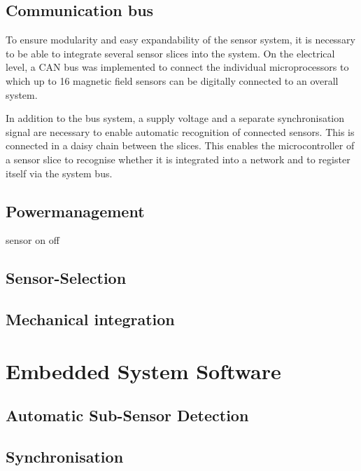 \documentclass[conference]{IEEEtran}
\begin{document}
\subsection{Communication bus}
To ensure modularity and easy expandability of the sensor system, it is necessary to be able to integrate several sensor slices into the system.
On the electrical level, a CAN bus was implemented to connect the individual microprocessors to which up to 16 magnetic field sensors can be digitally connected to an overall system.

In addition to the bus system, a supply voltage and a separate synchronisation signal are necessary to enable automatic recognition of connected sensors. This is connected in a daisy chain between the slices.
This enables the microcontroller of a sensor slice to recognise whether it is integrated into a network and to register itself via the system bus.



\subsection{Powermanagement}
sensor on off

\subsection{Sensor-Selection}


\subsection{Mechanical integration}

%
\section{Embedded System Software}

\subsection{Automatic Sub-Sensor Detection}



\subsection{Synchronisation}
\end{document}
